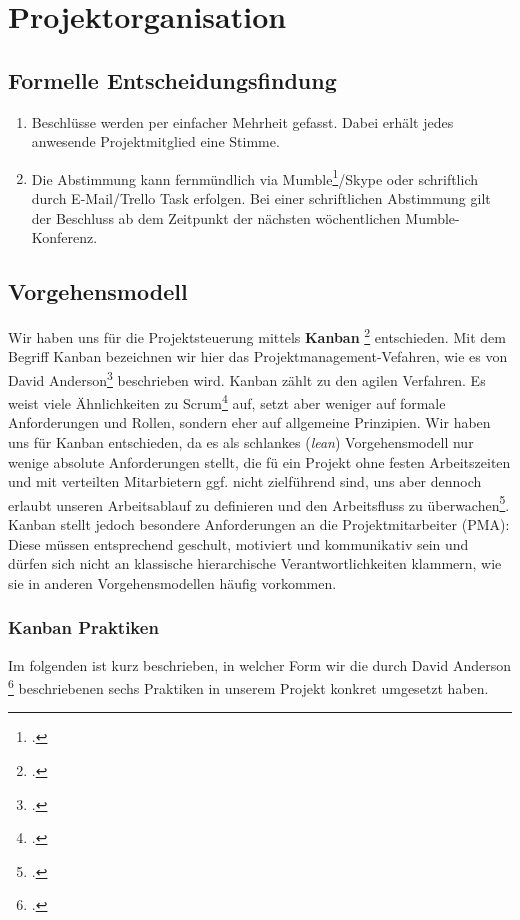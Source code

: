 
\section{Projektorganisation}

\subsection{Formelle Entscheidungsfindung}
\begin{enumerate}
\item Beschlüsse werden per einfacher Mehrheit gefasst. Dabei erhält jedes anwesende Projektmitglied eine Stimme.
\item Die Abstimmung kann fernmündlich via Mumble\footcite{mumble}/Skype oder schriftlich durch E-Mail/Trello Task erfolgen. Bei einer schriftlichen Abstimmung gilt der Beschluss ab dem Zeitpunkt der nächsten wöchentlichen Mumble-Konferenz.
\end{enumerate}

\subsection{Vorgehensmodell}
Wir haben uns für die Projektsteuerung mittels \textbf{Kanban} \footcite{wikiKanban} entschieden. Mit dem Begriff Kanban bezeichnen wir hier das Projektmanagement-Vefahren, wie es von David Anderson\footcite{anderson2011kanban} beschrieben wird. Kanban zählt zu den agilen Verfahren. Es weist viele Ähnlichkeiten zu Scrum\footcite{wikiScrum} auf, setzt aber weniger auf formale Anforderungen und Rollen, sondern eher auf allgemeine Prinzipien. Wir haben uns für Kanban entschieden, da es als schlankes (\textit{lean}) Vorgehensmodell nur wenige absolute Anforderungen stellt, die fü ein Projekt ohne festen Arbeitszeiten und mit verteilten Mitarbietern ggf. nicht zielführend sind, uns aber dennoch erlaubt unseren Arbeitsablauf zu definieren und den Arbeitsfluss zu überwachen\footcite{whyKanban}. Kanban stellt jedoch besondere Anforderungen an die Projektmitarbeiter (PMA): Diese müssen entsprechend geschult, motiviert und kommunikativ sein und dürfen sich nicht an klassische hierarchische Verantwortlichkeiten klammern, wie sie in anderen Vorgehensmodellen häufig vorkommen.

\subsubsection{Kanban Praktiken}
Im folgenden ist kurz beschrieben, in welcher Form wir die durch David Anderson \footcite{anderson2011kanban} beschriebenen sechs Praktiken in unserem Projekt konkret umgesetzt haben.


